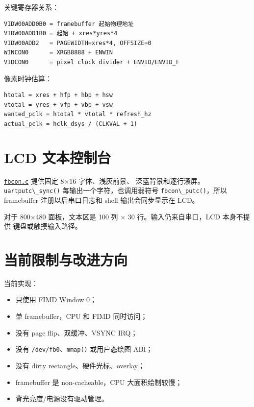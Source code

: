 关键寄存器关系：

\begin{lstlisting}
VIDW00ADD0B0 = framebuffer 起始物理地址
VIDW00ADD1B0 = 起始 + xres*yres*4
VIDW00ADD2   = PAGEWIDTH=xres*4, OFFSIZE=0
WINCON0      = XRGB8888 + ENWIN
VIDCON0      = pixel clock divider + ENVID/ENVID_F
\end{lstlisting}

像素时钟估算：

\begin{lstlisting}
htotal = xres + hfp + hbp + hsw
vtotal = yres + vfp + vbp + vsw
wanted_pclk = htotal * vtotal * refresh_hz
actual_pclk = hclk_dsys / (CLKVAL + 1)
\end{lstlisting}

\section{LCD 文本控制台}\label{lcd-ux6587ux672cux63a7ux5236ux53f0}

\href{../../../kernel/drivers/video/fbdev/fbcon.c}{\passthrough{\lstinline!fbcon.c!}}
提供固定 8×16 字体、浅灰前景、
深蓝背景和逐行滚屏。\passthrough{\lstinline!uartputc\_sync()!}
每输出一个字符，也调用弱符号
\passthrough{\lstinline!fbcon\_putc()!}，所以 framebuffer
注册以后串口日志和 shell 输出会同步显示在 LCD。

对于 800×480 面板，文本区是 100 列 × 30 行。输入仍来自串口，LCD
本身不提供 键盘或触摸输入路径。

\section{当前限制与改进方向}\label{ux5f53ux524dux9650ux5236ux4e0eux6539ux8fdbux65b9ux5411}

当前实现：

\begin{itemize}
\tightlist
\item
  只使用 FIMD Window 0；
\item
  单 framebuffer，CPU 和 FIMD 同时访问；
\item
  没有 page flip、双缓冲、VSYNC IRQ；
\item
  没有
  \passthrough{\lstinline!/dev/fb0!}、\passthrough{\lstinline!mmap()!}
  或用户态绘图 ABI；
\item
  没有 dirty rectangle、硬件光标、overlay；
\item
  framebuffer 是 non-cacheable，CPU 大面积绘制较慢；
\item
  背光亮度/电源没有驱动管理。
\end{itemize}


